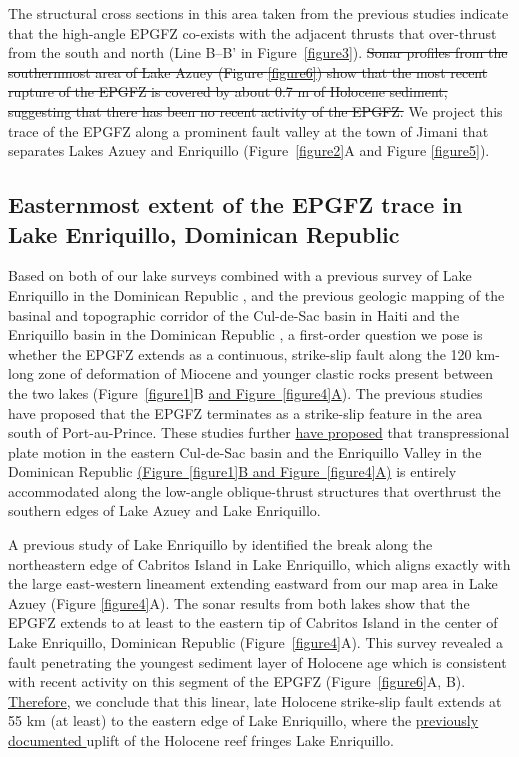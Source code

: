 \documentclass[linenumbers,draft]{agujournal}
\begin{document}
The structural cross sections in this area taken from the previous studies \citep{massoni1955haiti,mann1995actively,douilly2015three} indicate that the high-angle EPGFZ co-exists with the adjacent thrusts that over-thrust from the south and north (Line B--B' in Figure~\ref{figure3}). \st{Sonar profiles from the southernmost area of Lake Azuey (Figure {\ref{figure6}}) show that the most recent rupture of the EPGFZ is covered by about 0.7 m of Holocene sediment, suggesting that there has been no recent activity of the EPGFZ.} We project this trace of the EPGFZ along a prominent fault valley at the town of Jimani that separates Lakes Azuey and Enriquillo (Figure~\ref{figure2}A and Figure \ref{figure5}).

\subsection{Easternmost extent of the EPGFZ trace in Lake Enriquillo, Dominican Republic}
Based on both of our lake surveys combined with a previous survey of Lake Enriquillo in the Dominican Republic \citep{rios2013holocene}, and the previous geologic mapping of the basinal and topographic corridor of the Cul-de-Sac basin in Haiti and the Enriquillo basin in the Dominican Republic \citep{mann1995actively,mann1999caribbean}, a first-order question we pose is whether the EPGFZ extends as a continuous, strike-slip fault along the 120 km-long zone of deformation of Miocene and younger clastic rocks present between the two lakes (Figure~\ref{figure1}B \underline{and Figure~\ref{figure4}A}). The previous studies \citep{saint2015seismotectonics,symithe2016present} have proposed that the EPGFZ terminates as a strike-slip feature in the area south of Port-au-Prince. These studies further \ul{have proposed} that transpressional plate motion in the eastern Cul-de-Sac basin and the Enriquillo Valley in the Dominican Republic \underline{(Figure~\ref{figure1}B and Figure~\ref{figure4}A)} is entirely accommodated along the low-angle oblique-thrust structures that overthrust the southern edges of Lake Azuey and Lake Enriquillo. 

A previous study of Lake Enriquillo by \citet{rios2013holocene} identified the break along the northeastern edge of Cabritos Island in Lake Enriquillo, which aligns exactly with the large east-western lineament extending eastward from our map area in Lake Azuey (Figure \ref{figure4}A). The sonar results from both lakes show that the EPGFZ extends to at least to the eastern tip of Cabritos Island in the center of Lake Enriquillo, Dominican Republic \st{\mbox{\citep{mann1995actively}}} (Figure~\ref{figure4}A). This survey revealed a fault penetrating the youngest sediment layer of Holocene age which is consistent with recent activity on this segment of the EPGFZ (Figure~\ref{figure6}A, B). \ul{Therefore}, we conclude that this linear, late Holocene strike-slip fault extends at 55 km (at least) to the eastern edge of Lake Enriquillo, where the \underline{previously documented \citep{mann1995actively}} uplift of the Holocene reef fringes Lake Enriquillo.
\end{document}
